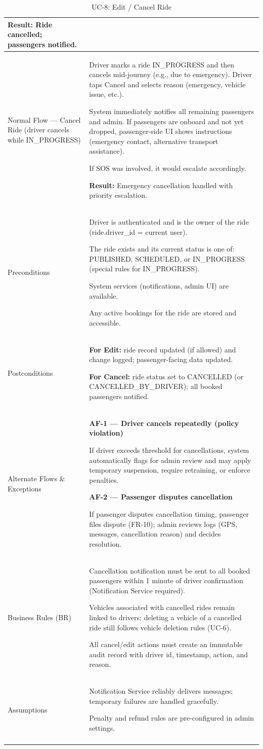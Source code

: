 \begin{longtable}{|p{3.5cm}|p{12cm}|}
\textbf{Result:} Ride cancelled; passengers notified. \\
\hline
Normal Flow — Cancel Ride (driver cancels while IN\_PROGRESS) &
Driver marks a ride IN\_PROGRESS and then cancels mid-journey (e.g., due to emergency). Driver taps Cancel and selects reason (emergency, vehicle issue, etc.).

System immediately notifies all remaining passengers and admin. If passengers are onboard and not yet dropped, passenger-side UI shows instructions (emergency contact, alternative transport assistance).

If SOS was involved, it would escalate accordingly.

\textbf{Result:} Emergency cancellation handled with priority escalation. \\
\hline
Preconditions &
Driver is authenticated and is the owner of the ride (ride.driver\_id = current user).

The ride exists and its current status is one of: PUBLISHED, SCHEDULED, or IN\_PROGRESS (special rules for IN\_PROGRESS).

System services (notifications, admin UI) are available.

Any active bookings for the ride are stored and accessible. \\
\hline
Postconditions &
\textbf{For Edit:} ride record updated (if allowed) and change logged; passenger-facing data updated.

\textbf{For Cancel:} ride status set to CANCELLED (or CANCELLED\_BY\_DRIVER); all booked passengers notified. \\
\hline
Alternate Flows \& Exceptions &
\textbf{AF-1 --- Driver cancels repeatedly (policy violation)}

If driver exceeds threshold for cancellations, system automatically flags for admin review and may apply temporary suspension, require retraining, or enforce penalties.

\textbf{AF-2 --- Passenger disputes cancellation}

If passenger disputes cancellation timing, passenger files dispute (FR-10); admin reviews logs (GPS, messages, cancellation reason) and decides resolution. \\
\hline
Business Rules (BR) &
Cancellation notification must be sent to all booked passengers within 1 minute of driver confirmation (Notification Service required).

Vehicles associated with cancelled rides remain linked to drivers; deleting a vehicle of a cancelled ride still follows vehicle deletion rules (UC-6).

All cancel/edit actions must create an immutable audit record with driver id, timestamp, action, and reason. \\
\hline
Assumptions &
Notification Service reliably delivers messages; temporary failures are handled gracefully.

Penalty and refund rules are pre-configured in admin settings. \\
\hline
\caption{UC-8: Edit / Cancel Ride}
\end{longtable}

